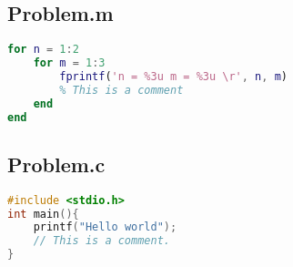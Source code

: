 \documentclass{ExpReport}
\begin{document}
\subsection{Problem.m}
\begin{lstlisting}[language=matlab]
for n = 1:2
    for m = 1:3
        fprintf('n = %3u m = %3u \r', n, m)
        % This is a comment
    end
end
\end{lstlisting}

\subsection{Problem.c}
\begin{lstlisting}[language=c]
#include <stdio.h>
int main(){
    printf("Hello world");
    // This is a comment.
}
\end{lstlisting}
\end{document}
